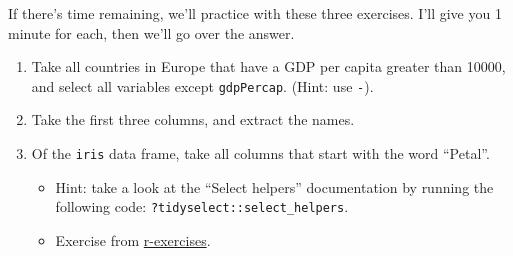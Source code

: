 \documentclass[]{article}
\providecommand{\tightlist}{%
  \setlength{\itemsep}{0pt}\setlength{\parskip}{0pt}}
\begin{document}
If there's time remaining, we'll practice with these three exercises.
I'll give you 1 minute for each, then we'll go over the answer.

\begin{enumerate}
\def\labelenumi{\arabic{enumi}.}
\item
  Take all countries in Europe that have a GDP per capita greater than
  10000, and select all variables except \texttt{gdpPercap}. (Hint: use
  \texttt{-}).
\item
  Take the first three columns, and extract the names.
\item
  Of the \texttt{iris} data frame, take all columns that start with the
  word ``Petal''.

  \begin{itemize}
  \tightlist
  \item
    Hint: take a look at the ``Select helpers'' documentation by running
    the following code: \texttt{?tidyselect::select\_helpers}.
  \item
    Exercise from
    \href{https://www.r-exercises.com/2017/10/19/dplyr-basic-functions-exercises/}{r-exercises}.
  \end{itemize}
\end{enumerate}
\end{document}
